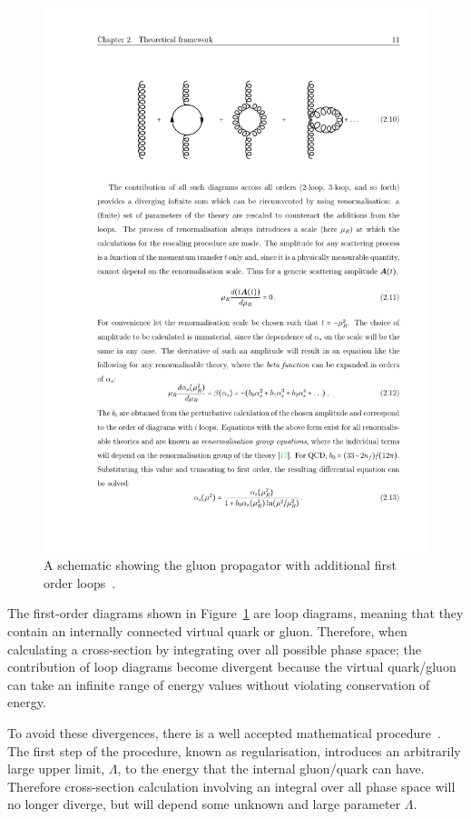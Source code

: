 \begin{figure}[!hbt]
  \begin{center}
    \includegraphics[width=0.6\linewidth, angle=0]{figs/Theory/qcd_gluon_loop.pdf}
  \end{center}
  \vspace{-1em}
  \caption[A schematic showing the gluon propagator with additional first order loops.]
  {A schematic showing the gluon propagator with additional first order loops~\cite{det-thesis_kate}.}
  \label{fig:theo-qcd_gluon}
\end{figure}
\vspace{-1em}

The first-order diagrams shown in Figure~\ref{fig:theo-qcd_gluon} are loop diagrams,
meaning that they contain an internally connected virtual quark or gluon.
Therefore, when calculating a cross-section by integrating over all possible phase space;
the contribution of loop diagrams become divergent
because the virtual quark/gluon can take an infinite range of energy values without violating conservation of energy.

To avoid these divergences, there is a well accepted mathematical procedure~\cite{obj-bjets_PDG,theo-zee}.
The first step of the procedure, known as regularisation,
introduces an arbitrarily large upper limit, $\Lambda$, to the energy that the internal gluon/quark can have.
Therefore cross-section calculation involving an integral over all phase space will no longer diverge,
but will depend some unknown and large parameter $\Lambda$.

